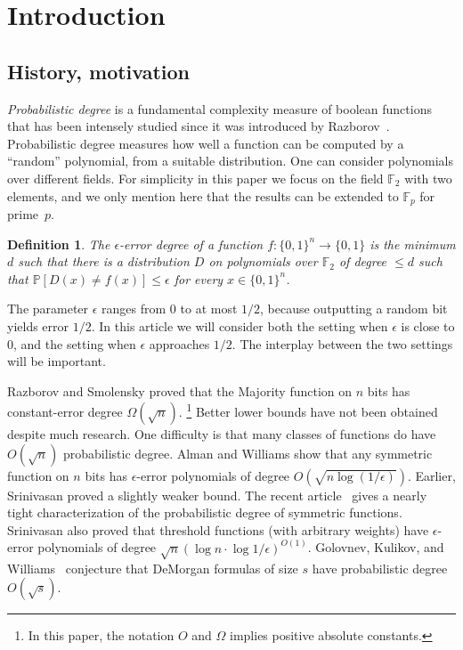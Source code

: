 \documentclass{toc}
\newtheorem{defn}[theorem]{Definition}
\newcommand{\zo}{\{0, 1\}}
\newcommand{\F}{\mathbb{F}}
\renewcommand{\P}{\mathbb{P}}
\newcommand{\eps}{\epsilon}
\newcommand{\e}{\epsilon}
\begin{document}
\section{Introduction}
%
%
%
%

%
%
%
\subsection{History, motivation}  %
\label{preamble}                  %

\emph{Probabilistic degree} is a fundamental complexity measure of
boolean functions that has been intensely studied since it was introduced
by Razborov~\cite{Raz87}. Probabilistic degree measures how well
a function can be computed by a ``random'' polynomial, from a suitable
distribution. One can consider polynomials over different fields.
For simplicity in this paper we focus on the field $\F_{2}$ with
two elements, and we only mention here that the results can be extended
to $\F_{p}$ for prime~$p$.

\begin{defn}
The \emph{$\e$-error degree} of a function $f:\zo^{n}\to\zo$ is
the minimum $d$ such that there is a distribution $D$ on polynomials
over $\F_{2}$ of degree $\le d$ such that
$\P[D(x) \ne f(x)] \le \eps$
for every $x\in\zo^{n}$.
\end{defn}

The parameter $\e$ ranges from $0$ to at most $1/2$, because outputting
a random bit yields error $1/2$. In this %
article  %
we will consider both
the setting when $\e$ is close to $0$, and the setting when $\e$
approaches $1/2$. The interplay between the two settings will be
important.

%
%
Razborov and Smolensky \cite{Raz87,Smo87,Smolensky93} proved
that the Majority function on $n$ bits has constant-error degree
$\Omega(\sqrt{n})$.%
%
%
\footnote{In this paper, %
the notation $O$ and $\Omega$ %
implies positive %
absolute constants.}
Better lower bounds have not been obtained despite much
research. One difficulty is that many classes of functions do have
$O(\sqrt{n})$ probabilistic degree.
Alman and Williams
%
show \cite[Theorem 1.2]{DBLP:conf/focs/AlmanW15}   %
that any symmetric function on $n$ bits has $\e$-error
polynomials of degree $O(\sqrt{n\log(1/\e)})$. Earlier, Srinivasan
\cite{DBLP:conf/fsttcs/Srinivasan13} proved a slightly weaker bound.
The recent %
article~\cite{srinivasan2019probabilistic}  %
gives a nearly
tight characterization of the probabilistic degree of symmetric functions.
Srinivasan %
\cite[Theorem 12]{DBLP:conf/fsttcs/Srinivasan13}  %
also
proved that threshold functions (with arbitrary weights) have $\e$-error
polynomials of degree 
$\sqrt{n}(\log n\cdot\log1/\e)^{O(1)}$.
Golovnev, Kulikov, and Williams~%
%
\cite{DBLP:journals/eccc/GolovnevKW18}
conjecture that DeMorgan formulas of size $s$ have probabilistic
degree $O(\sqrt{s})$. %
%
%
\end{document}
